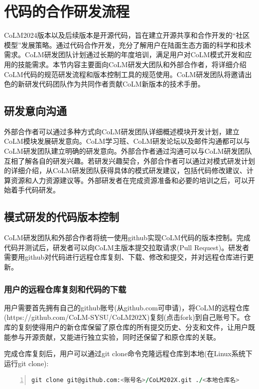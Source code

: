 \section{代码的合作研发流程}

CoLM2024版本以及后续版本是开源代码，旨在建立开源共享和合作开发的“社区模型”发展策略。通过代码合作开发，充分了解用户在陆面生态方面的科学和技术需求。CoLM研发团队计划通过长期的年度培训，满足用户对CoLM模式开发和应用的技能需求。本节内容主要面向CoLM研发大团队和外部合作者，将详细介绍CoLM代码的规范研发流程和版本控制工具的规范使用。CoLM研发团队将邀请出色的新研发代码团队作为共同作者贡献CoLM新版本的技术手册。

\subsection{研发意向沟通}
外部合作者可以通过多种方式向CoLM研发团队详细概述模块开发计划，建立CoLM模块发展研发意向。CoLM学习班、CoLM研发论坛以及邮件沟通都可以与CoLM研发团队建立明确的研发意向。外部合作者通过沟通可以与CoLM研发团队互相了解各自的研发兴趣。若研发兴趣契合，外部合作者可以通过对模式研发计划的详细介绍，从CoLM研发团队获得具体的模式研发建议，包括代码修改建议、计算资源和人力资源建议等。外部研发者在完成资源准备和必要的培训之后，可以开始着手代码研发。

\subsection{模式研发的代码版本控制}
CoLM研发团队和外部合作者将统一使用github实现CoLM代码的版本控制。完成代码并测试后，研发者可以向CoLM主版本提交拉取请求(Pull Request)。研发者需要用github对代码进行远程仓库复刻、下载、修改和提交，并对远程仓库进行更新。

\subsubsection{用户的远程仓库复刻和代码的下载}
用户需要首先拥有自己的github账号(从github.com可申请)，将CoLM的远程仓库(https://github.com/CoLM-SYSU/CoLM202X)复刻(点击fork)到自己账号下。仓库的复刻使得用户的新仓库保留了原仓库的所有提交历史、分支和文件，让用户既能参与开源贡献，又能进行独立实验，同时还保留了和原仓库的关联。

完成仓库复刻后，用户可以通过git clone命令克隆远程仓库到本地(在Linux系统下运行git clone):
\begin{lstlisting}[language=fortran, basicstyle=\linespread{1.0}\footnotesize\ttfamily, commentstyle=\color{olive}, numbers=left, numberstyle=\tiny, xleftmargin=1.5em,xrightmargin=0em, aboveskip=1em]
    git clone git@github.com:<账号名>/CoLM202X.git ./<本地仓库名>
\end{lstlisting}


